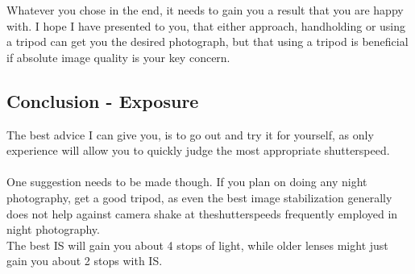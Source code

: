 Whatever you chose in the end, it needs to gain you a result that you are happy with. I hope I have presented to you, that either approach, handholding or using a tripod can get you the desired photograph, but that using a tripod is beneficial if absolute image quality is your key concern.

\subsection{Conclusion - Exposure}

The best advice I can give you, is to go out and try it for yourself, as only experience will allow you to quickly judge the most appropriate \gls{shutterspeed}.
\\
\\
One suggestion needs to be made though. If you plan on doing any night photography, get a good tripod, as even the best image stabilization generally does not help against camera shake at the\glspl{shutterspeed} frequently employed in night photography.
\\
The best \gls{IS} will gain you about 4 \glspl{stop} of light, while older lenses might just gain you about 2 \glspl{stop} with \gls{IS}.